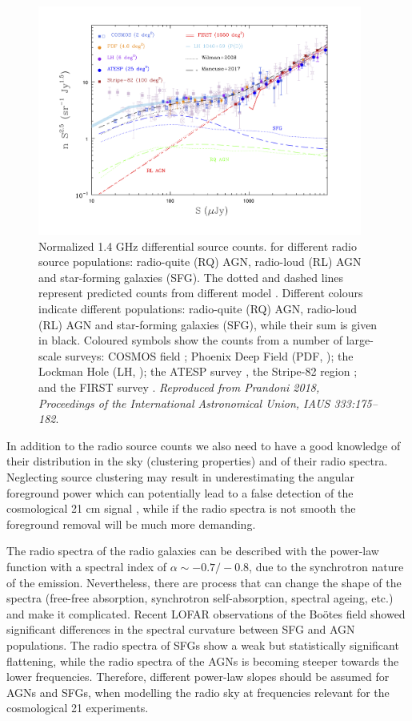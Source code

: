 \begin{figure}[!t]
   \centering
    \includegraphics[width=0.95\textwidth]{Chapman_Jelic/Images/extragal.png}
    \caption{Normalized 1.4 GHz differential source counts. for different radio source populations: radio-quite (RQ) AGN, radio-loud (RL) AGN and star-forming galaxies (SFG). The dotted and dashed lines represent predicted counts from different model  \cite{mancuso17,wilman08,wilman10}. Different colours indicate different populations: radio-quite (RQ) AGN, radio-loud (RL) AGN and star-forming galaxies (SFG), while their sum is given in black. Coloured symbols show the counts from a number of large-scale surveys: COSMOS field \cite{bondi08, smolcic17b}; Phoenix Deep Field (PDF, \cite{hopkins03}); the Lockman Hole (LH, \cite{prandoni18}); the ATESP survey \cite{prandoni01}, the Stripe-82 region \cite{heywood16}; and the FIRST survey \cite{white97}. \textit{Reproduced from Prandoni 2018, Proceedings of the International Astronomical Union, IAUS 333:175--182}. }
    \label{fig:extragal}
\end{figure}

In addition to the radio source counts we also need to have a good knowledge of their distribution in the sky (clustering properties) and of their radio spectra. Neglecting source clustering may result in underestimating the angular foreground power which can potentially lead to a false detection of the cosmological 21 cm signal \cite{murray17,murray18}, while if the radio spectra is not smooth the foreground removal will be much more demanding.

The radio spectra of the radio galaxies can be described with the power-law function with a spectral index of  $\alpha\sim-0.7/-0.8$, due to the synchrotron nature of the emission.  Nevertheless, there are process that can change the shape of the spectra (free-free absorption, synchrotron self-absorption, spectral ageing, etc.) and make it complicated. Recent  LOFAR observations of the Bo\"otes field \cite{calistrorivera17} showed significant differences in the spectral curvature between SFG and AGN populations. The radio spectra of SFGs show a weak but statistically significant flattening, while the radio spectra of the AGNs is becoming steeper towards  the lower frequencies. Therefore, different power-law slopes should be assumed for AGNs and SFGs, when modelling the radio sky at frequencies relevant for the cosmological 21 experiments.

